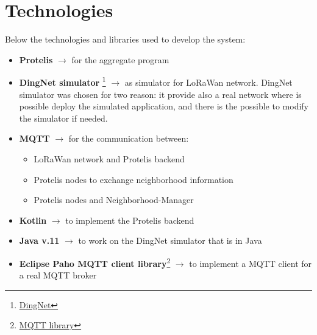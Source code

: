 \chapter{Technologies}

Below the technologies and libraries used to develop the system:

\begin{itemize}
    \item \textbf{Protelis} $\rightarrow$ for the aggregate program
    \item \textbf{DingNet simulator} \footnote{\href{https://github.com/dimoibiehg/DingNet}{DingNet}} $\rightarrow$  as simulator for LoRaWan network. DingNet simulator was chosen for two reason: it provide also a real network where is possible deploy the simulated application, and there is the possible to modify the simulator if needed.  
    \item \textbf{MQTT} $\rightarrow$ for the communication between:
    \begin{itemize}
        \item LoRaWan network and Protelis backend
        \item Protelis nodes to exchange neighborhood information
        \item Protelis nodes and Neighborhood-Manager
    \end{itemize}
    \item \textbf{Kotlin} $\rightarrow$ to implement the Protelis backend
    \item \textbf{Java v.11} $\rightarrow$ to work on the DingNet simulator that is in Java
    \item \textbf{Eclipse Paho MQTT client library}\footnote{\href{https://github.com/eclipse/paho.mqtt.java}{MQTT library}} $\rightarrow$ to implement a MQTT client for a real MQTT broker
\end{itemize}

